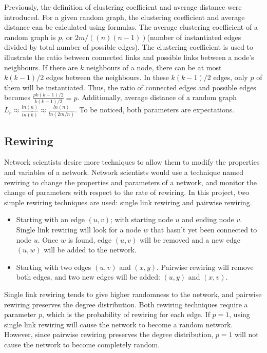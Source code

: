 \documentclass[12pt]{article}
\begin{document}
\par
Previously, the definition of clustering coefficient and average distance were introduced. For a given random graph, the clustering coefficient and average distance can be calculated using formulas.\cite{barabási2016network} The average clustering coefficient of a random graph is $p$, or $2m/((n)(n-1))$(number of instantiated edges divided by total number of possible edges). The clustering coefficient is used to illustrate the ratio between connected links and possible links between a node's neighbours. If there are $k$ neighbours of a node, there can be at most $k(k-1)/2$ edges between the neighbours. In these $k(k-1)/2$ edges, only $p$ of them will be instantiated. Thus, the ratio of connected edges and possible edges becomes $\frac{pk(k-1)/2}{k(k-1)/2}=p$. Additionally, average distance of a random graph $L_r \approx \frac{ln(n)}{ln\bar{(k)}}\approx \frac{ln(n)}{ln(2m/n)}$. To be noticed, both parameters are expectations.

\subsection{Rewiring}
\label{rewiring}
Network scientists desire more techniques to allow them to modify the properties and variables of a network. Network scientists would use a technique named rewiring to change the properties and parameters of a network, and monitor the change of parameters with respect to the rate of rewiring.\cite{network_rewiring} In this project, two simple rewiring techniques are used: single link rewiring and pairwise rewiring.\\
\begin{itemize}
    \item Starting with an edge $(u,v)$; with starting node $u$ and ending node $v$. Single link rewiring will look for a node $w$ that hasn't yet been connected to node $u$. Once $w$ is found, edge $(u,v)$ will be removed and a new edge $(u,w)$ will be added to the network. 
    \item Starting with two edges $(u,v)$ and $(x,y)$. Pairwise rewiring will remove both edges, and two new edges will be added: $(u,y)$ and $(x,v)$.
\end{itemize}

Single link rewiring tends to give higher randomness to the network, and pairwise rewiring preserves the degree distribution. Both rewiring techniques require a parameter $p$, which is the probability of rewiring for each edge. If $p=1$, using single link rewiring will cause the network to become a random network. However, since pairwise rewiring preserves the degree distribution, $p=1$ will not cause the network to become completely random.
\end{document}

